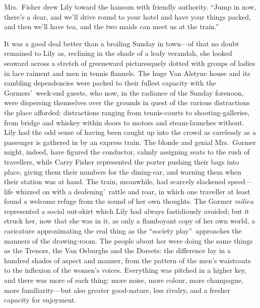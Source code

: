 \documentclass[12pt,a4paper]{book}
\begin{document}
Mrs.\ Fisher drew Lily toward the hansom with friendly authority. 
``Jump in now, there's a dear, and we'll drive round to your hotel
and have your things packed, and then we'll have tea, and the two
maids can meet us at the train.''







It was a good deal better than a broiling Sunday in town---of
that no doubt remained to Lily as, reclining in the shade of a
leafy verandah, she looked seaward across a stretch of greensward
picturesquely dotted with groups of ladies in lace raiment and
men in tennis flannels. The huge Van Alstyne house and its
rambling dependencies were packed to their fullest capacity with
the Gormers'\ week-end guests, who now, in the radiance of the
Sunday forenoon, were dispersing themselves over the grounds in
quest of the various distractions the place afforded: 
distractions ranging from tennis-courts to shooting-galleries,
from bridge and whiskey within doors to motors and steam-launches
without. Lily had the odd sense of having been caught up into the
crowd as carelessly as a passenger is gathered in by an express
train. The blonde and genial Mrs.\ Gormer might, indeed, have
figured the conductor, calmly assigning seats to the rush of
travellers, while Carry Fisher represented the porter pushing
their bags into place, giving them their numbers for the
dining-car, and warning them when their station was at hand. The
train, meanwhile, had scarcely slackened speed---life whizzed on
with a deafening'\ rattle and roar, in which one traveller at
least found a welcome refuge from the sound of her own thoughts. 
The Gormer \textit{milieu} represented a social out-skirt which Lily had
always fastidiously avoided; but it struck her, now that she was
in it, as only a flamboyant copy of her own world, a caricature
approximating the real thing as the ``society play''\ approaches the
manners of the drawing-room. The people about her were doing the
same things as the Trenors, the Van Osburghs and the Dorsets: the
difference lay in a hundred shades of aspect and manner, from the
pattern of the men's waistcoats to the inflexion of the women's
voices. Everything was pitched in a higher key, and there was
more of each thing: more noise, more colour, more champagne, more
familiarity---but also greater good-nature, less rivalry, and a
fresher capacity for enjoyment.
\end{document}
